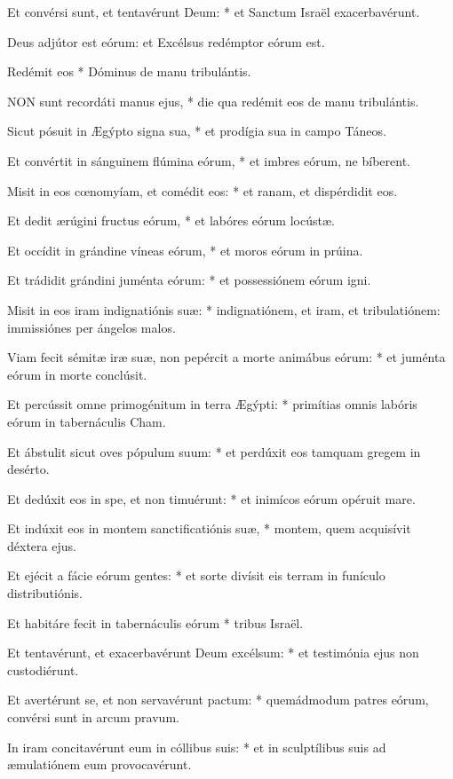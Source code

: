 Et convérsi sunt, et tentavérunt Deum: * et Sanctum Israël exacerbavérunt.

 Deus adjútor est eórum: et Excélsus redémptor eórum est.

 Redémit eos * Dóminus de manu tribulántis.


\lettrine[lines=2]{N}{ON} sunt recordáti manus ejus, * die qua redémit eos de manu tribulántis.

Sicut pósuit in Ægýpto signa sua, * et prodígia sua in campo Táneos.

Et convértit in sánguinem flúmina eórum, * et imbres eórum, ne bíberent.

Misit in eos cœnomyíam, et comédit eos: * et ranam, et dispérdidit eos.

Et dedit ærúgini fructus eórum, * et labóres eórum locústæ.

Et occídit in grándine víneas eórum, * et moros eórum in prúina.

Et trádidit grándini juménta eórum: * et possessiónem eórum igni.

Misit in eos iram indignatiónis suæ: * indignatiónem, et iram, et tribulatiónem: immissiónes per ángelos malos.

Viam fecit sémitæ iræ suæ, non pepércit a morte animábus eórum: * et juménta eórum in morte conclúsit.

Et percússit omne primogénitum in terra Ægýpti: * primítias omnis labóris eórum in tabernáculis Cham.

Et ábstulit sicut oves pópulum suum: * et perdúxit eos tamquam gregem in desérto.

Et dedúxit eos in spe, et non timuérunt: * et inimícos eórum opéruit mare.

Et indúxit eos in montem sanctificatiónis suæ, * montem, quem acquisívit déxtera ejus.

Et ejécit a fácie eórum gentes: * et sorte divísit eis terram in funículo distributiónis.

Et habitáre fecit in tabernáculis eórum * tribus Israël.

Et tentavérunt, et exacerbavérunt Deum excélsum: * et testimónia ejus non custodiérunt.

Et avertérunt se, et non servavérunt pactum: * quemádmodum patres eórum, convérsi sunt in arcum pravum.

In iram concitavérunt eum in cóllibus suis: * et in sculptílibus suis ad æmulatiónem eum provocavérunt.

